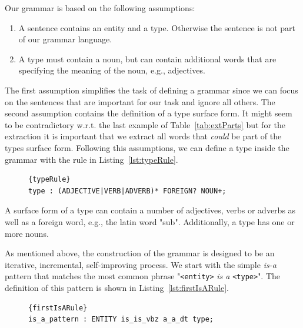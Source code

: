 Our grammar is based on the following assumptions:
\begin{enumerate}
\item A sentence contains an entity and a type. Otherwise the sentence is not part of our grammar language.
\item A type must contain a noun, but can contain additional words that are specifying the meaning of the noun, e.g., adjectives.
\end{enumerate}

The first assumption simplifies the task of defining a grammar since we can focus on the sentences that are important for our task and ignore all others.
The second assumption contains the definition of a type surface form.
It might seem to be contradictory w.r.t. the last example of Table~\ref{tab:extParts} but for the extraction it is important that we extract all words that \emph{could} be part of the types surface form.
Following this assumptions, we can define a type inside the grammar with the rule in Listing~\ref{lst:typeRule}.

\lstset{
  numbers=none
%  
}

\begin{figure}[htb!]
\begin{lstlisting}[label=lst:typeRule, caption=The grammar rule defining a type surface form.]{typeRule}
type : (ADJECTIVE|VERB|ADVERB)* FOREIGN? NOUN+;
\end{lstlisting}
\end{figure}

A surface form of a type can contain a number of adjectives, verbs or adverbs as well as a foreign word, e.g., the latin word "sub".
Additionally, a type has one or more nouns.

As mentioned above, the construction of the grammar is designed to be an iterative, incremental, self-improving process.
We start with the simple \emph{is-a} pattern that matches the most common phrase "\texttt{<entity>} \emph{is a} \texttt{<type>}". 
The definition of this pattern is shown in Listing~\ref{lst:firstIsARule}.
\begin{figure}[htb!]
\begin{lstlisting}[label=lst:firstIsARule,caption=First simple version of the \emph{is-a} pattern. \texttt{ENTITY} marks the position of an entity.]{firstIsARule}
is_a_pattern : ENTITY is_is_vbz a_a_dt type;
\end{lstlisting}
\end{figure}

